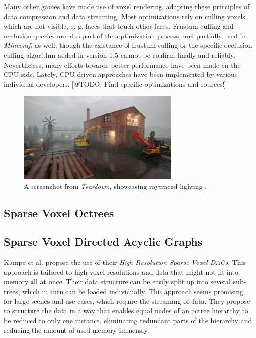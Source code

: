 \noindent
Many other games have made use of voxel rendering, adapting these principles of data compression and data streaming. 
Most optimizations rely on culling voxels which are not visible, e. g. faces that touch other faces.
Frustum culling and occlusion queries are also part of the optimization process, and partially used in \emph{Minecraft} 
as well, though the existance of frustum culling or the specific occlusion culling algorithm added in version 1.5 
cannot be confirm finally and reliably. Nevertheless, many efforts towards better performance have been made on the 
\ac{CPU} side. Lately, \ac{GPU}-driven approaches have been implemented by various individual developers. 
[@TODO: Find specific optimizations and sources!]  \\

\begin{figure}[h]
    \centering
    \includegraphics[width=300px]{images/graphics/teardown-ray-tracing.jpg}
    \caption{A screenshot from \emph{Teardown}, showcasing raytraced lighting \cite{TeardownSteam2022}.}
    \label{fig:teardown-raytracing}
\end{figure}

\subsection*{Sparse Voxel Octrees}

\subsection*{Sparse Voxel Directed Acyclic Graphs}

Kampe et al. \cite{Kampe2013} propose the use of their \emph{High-Resolution Sparse Voxel \ac{DAG}s}. This approach 
is tailored to high voxel resolutions and data that might not fit into memory all at once. Their data structure can 
be easily split up into several sub-trees, which in turn can be loaded individually. This approach seems promising 
for large scenes and use cases, which require the streaming of data. They propose to structure the data in a way that 
enables equal nodes of an octree hierarchy to be reduced to only one instance, eliminating redundant parts of the 
hierarchy and reducing the amount of used memory immensly. \\

